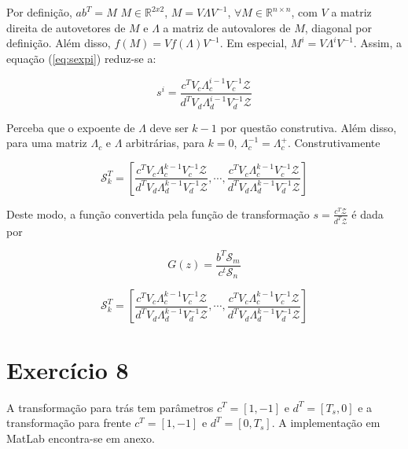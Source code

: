 \documentclass[twoside, fleqn]{article}
\begin{document}
    Por definição, $a b^T = M \,\, M \in \mathbb{R}^{2x2}$, $M = V \Lambda V^{-1}$, $\forall M \in \mathbb{R}^{n \times n}$, com $V$ a matriz direita de autovetores de $M$ e $\Lambda$ a matriz de autovalores de $M$, diagonal por definição. Além disso, $f(M) = V f(\Lambda) V^{-1}$. Em especial, $M^i = V \Lambda^i V^{-1}$. Assim, a equação (\ref{eq:sexpi}) reduz-se a:
    
    \begin{equation}
        s^i = \frac{c^T V_c \Lambda_c^{i-1} V_c^{-1} \mathcal{Z}}{d^T V_d \Lambda_d^{i-1} V_d^{-1} \mathcal{Z}}
    \end{equation}
    
    Perceba que o expoente de $\Lambda$ deve ser $k - 1$ por questão construtiva. Além disso, para uma matriz $\Lambda_c$ e $\Lambda$ arbitrárias, para $k = 0$, $\Lambda_c^{-1} = \Lambda_c^{+}$. Construtivamente
    
    \begin{equation}
        \mathcal{S}_k^T = \left[\frac{c^T V_c \Lambda_c^{k-1} V_c^{-1} \mathcal{Z}}{d^T V_d \Lambda_d^{k-1} V_d^{-1} \mathcal{Z}}, \cdots, \frac{c^T V_c \Lambda_c^{k-1} V_c^{-1} \mathcal{Z}}{d^T V_d \Lambda_d^{k-1} V_d^{-1} \mathcal{Z}}\right]
    \end{equation}
    
    Deste modo, a função convertida pela função de transformação $s = \frac{c^T \mathcal{Z}}{d^T \mathcal{Z}}$ é dada por
    
    \begin{equation}
        G(z) = \frac{b^T \mathcal{S}_m}{c^t \mathcal{S}_n}    
    \end{equation}
    
    \begin{equation}
        \mathcal{S}_k^T = \left[\frac{c^T V_c \Lambda_c^{k-1} V_c^{-1} \mathcal{Z}}{d^T V_d \Lambda_d^{k-1} V_d^{-1} \mathcal{Z}}, \cdots, \frac{c^T V_c \Lambda_c^{k-1} V_c^{-1} \mathcal{Z}}{d^T V_d \Lambda_d^{k-1} V_d^{-1} \mathcal{Z}}\right]
    \end{equation}

\section*{Exercício 8}

    A transformação para trás tem parâmetros $c^T = [1, -1]$ e $d^T = [T_s, 0]$ e a transformação para frente $c^T = [1, -1]$ e $d^T = [0, T_s]$. A implementação em MatLab encontra-se em anexo.
\end{document}
